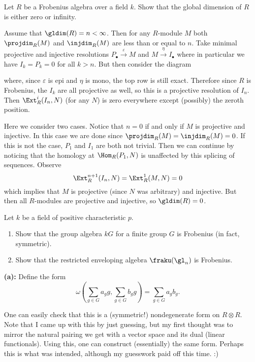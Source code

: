 \documentclass[12pt]{article}
\begin{document}
\begin{prob}
	Let $R$ be a Frobenius algebra over a field $k$. Show that the global dimension of $R$ is either zero or infinity.
\end{prob}
\begin{sol}
	Assume that $\gldim(R)=n<\infty$. Then for any $R$-module $M$ both $\projdim_R(M)$ and $\injdim_R(M)$
	are less than or equal to $n$. Take minimal projective and injective resolutions $P_\bullet\xrightarrow{\varepsilon} M$ and $M\xrightarrow{\eta} I_\bullet$
	where in particular we have $I_k=P_k=0$ for all $k>n.$ But then consider the diagram 
	\begin{center}
	\end{center}
	where, since $\varepsilon$ is epi and $\eta$ is mono, the top row is still exact. Therefore since $R$ is Frobenius, 
	the $I_k$ are all projective as well, so this is a projective resolution of $I_n$. Then $\Ext^i_R(I_n,N)$ (for any $N$)
	is zero everywhere except (possibly) the zeroth position.

	Here we consider two cases. Notice that $n=0$ if and only if $M$ is projective and injective. In this case we are done since $\projdim_R(M)=\injdim_R(M)=0$. If this is not the case, 
	$P_1$ and $I_1$ are both not trivial. Then we can continue by noticing that the homology at $\Hom_R(P_1,N)$ is unaffected 
	by this splicing of sequences. Observe 
	\[\Ext_R^{n+1}(I_n,N)=\Ext_R^1(M,N)=0\]
	which implies that $M$ is projective (since $N$ was arbitrary) and injective. But then all $R$-modules are projective and injective,
	so $\gldim(R)=0$.
\end{sol}

\begin{prob}
	Let $k$ be a field of positive characteristic $p$. 
	\begin{enumerate} 
		\item Show that the group algebra $kG$ for a finite group $G$ is Frobenius (in fact, symmetric). 
		\item Show that the restricted enveloping algebra $\fraku(\gl_n)$ is Frobenius. 
	\end{enumerate} 
\end{prob}
\begin{sol}
	\textbf{(a):} Define the form 
	\[\omega\left(\sum_{g\in G}a_gg,\sum_{g\in G}b_g g\right)=\sum_{g\in G}a_gb_g.\]

	One can easily check that this is a (symmetric!) nondegenerate form on $R\otimes R$. Note that I came up with this 
	by just guessing, but my first thought was to mirror the natural pairing we get with a vector space and its dual (linear functionals). Using this,
	one can construct (essentially) the same form. Perhaps this is what was intended, although my guesswork paid off this time. :)
\end{sol}
\end{document}
